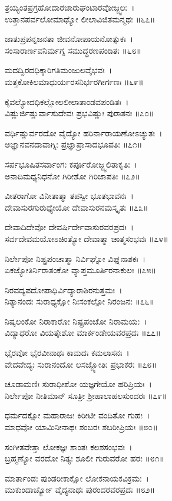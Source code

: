 	ತ್ರಯ್ಯಂತಪ್ರಗ್ರಹೋದಾರಚಾರುಘಂಟಾರವೋಜ್ಜ್ವಲಃ~।\\
	ಉತ್ತಾನಪರ್ವಲೋಮಾಢ್ಯೋ ಲೀಲಾವಿಜಿತಮನ್ಮಥಃ ॥೬೭॥

ಜಾತುಪ್ರಪನ್ನಜನತಾ ಜೀವನೋಪಾಯನೋತ್ಸುಕಃ~।\\
ಸಂಸಾರಾರ್ಣವನಿರ್ಮಗ್ನ ಸಮುದ್ಧರಣಪಂಡಿತಃ ॥೬೮॥

	ಮದದ್ವಿರದಧಿಕ್ಕಾರಿಗತಿಮಂಜುಲವೈಭವಃ~।\\
	ಮತ್ತಕೋಕಿಲಮಾಧುರ್ಯರಸನಿರ್ಭರಗೀರ್ಗಣಃ ॥೬೯॥

ಕೈವಲ್ಯೋದಧಿಕಲ್ಲೋಲಲೀಲಾತಾಂಡವಪಂಡಿತಃ~।\\
ವಿಷ್ಣುರ್ಜಿಷ್ಣುರ್ವಾಸುದೇವಃ ಪ್ರಭವಿಷ್ಣುಃ ಪುರಾತನಃ ॥೭೦॥

	ವರ್ಧಿಷ್ಣುರ್ವರದೋ ವೈದ್ಯೋ ಹರಿರ್ನಾರಾಯಣೋಽಚ್ಯುತಃ~।\\
	ಅಜ್ಞಾನವನದಾವಾಗ್ನಿಃ ಪ್ರಜ್ಞಾಪ್ರಾಸಾದಭೂಪತಿಃ ॥೭೧॥

ಸರ್ಪಭೂಷಿತಸರ್ವಾಂಗಃ ಕರ್ಪೂರೋಜ್ಜ್ವಲಿತಾಕೃತಿಃ~।\\
ಅನಾದಿಮಧ್ಯನಿಧನೋ ಗಿರೀಶೋ ಗಿರಿಜಾಪತಿಃ ॥೭೨॥

	ವೀತರಾಗೋ ವಿನೀತಾತ್ಮಾ ತಪಸ್ವೀ ಭೂತಭಾವನಃ~।\\
	ದೇವಾಸುರಗುರುಧ್ಯೇಯೋ ದೇವಾಸುರನಮಸ್ಕೃತಃ ॥೭೩॥

ದೇವಾದಿದೇವೋ ದೇವರ್ಷಿರ್ದೇವಾಸುರವರಪ್ರದಃ~।\\
ಸರ್ವದೇವಮಯೋಽಚಿಂತ್ಯೋ ದೇವಾತ್ಮಾ ಚಾತ್ಮಸಂಭವಃ ॥೭೪॥

	ನಿರ್ಲೇಪೋ ನಿಷ್ಪ್ರಪಂಚಾತ್ಮಾ ನಿರ್ವಿಘ್ನೋ ವಿಘ್ನನಾಶಕಃ~।\\
	ಏಕಜ್ಯೋತಿರ್ನಿರಾತಂಕೋ ವ್ಯಾಪ್ತಮೂರ್ತಿರನಾಕುಲಃ ॥೭೫॥

ನಿರವದ್ಯಪದೋಪಾಧಿರ್ವಿದ್ಯಾರಾಶಿರನುತ್ತಮಃ~।\\
ನಿತ್ಯಾನಂದಃ ಸುರಾಧ್ಯಕ್ಷೋ ನಿಃಸಂಕಲ್ಪೋ ನಿರಂಜನಃ ॥೭೬॥

	ನಿಷ್ಕಲಂಕೋ ನಿರಾಕಾರೋ ನಿಷ್ಪ್ರಪಂಚೋ ನಿರಾಮಯಃ~।\\
	ವಿದ್ಯಾಧರೋ ವಿಯತ್ಕೇಶೋ ಮಾರ್ಕಂಡೇಯವರಪ್ರದಃ ॥೭೭॥

ಭೈರವೋ ಭೈರವೀನಾಥಃ ಕಾಮದಃ ಕಮಲಾಸನಃ~।\\
ವೇದವೇದ್ಯಃ ಸುರಾನಂದೋ ಲಸಜ್ಜ್ಯೋತಿಃ ಪ್ರಭಾಕರಃ ॥೭೮॥

	ಚೂಡಾಮಣಿಃ ಸುರಾಧೀಶೋ ಯಜ್ಞಗೇಯೋ ಹರಿಪ್ರಿಯಃ~।\\
	ನಿರ್ಲೇಪೋ ನೀತಿಮಾನ್ ಸೂತ್ರೀ ಶ್ರೀಹಾಲಾಹಲಸುಂದರಃ ॥೭೯॥

ಧರ್ಮದಕ್ಷೋ ಮಹಾರಾಜಃ ಕಿರೀಟೀ ವಂದಿತೋ ಗುಹಃ~।\\
ಮಾಧವೋ ಯಾಮಿನೀನಾಥಃ ಶಂಬರಃ ಶಬರೀಪ್ರಿಯಃ ॥೮೦॥

	ಸಂಗೀತವೇತ್ತಾ ಲೋಕಜ್ಞಃ ಶಾಂತಃ ಕಲಶಸಂಭವಃ~।\\
	ಬ್ರಹ್ಮಣ್ಯೋ ವರದೋ ನಿತ್ಯಃ ಶೂಲೀ ಗುರುವರೋ ಹರಃ ॥೮೧॥

ಮಾರ್ತಾಂಡಃ ಪುಂಡರೀಕಾಕ್ಷೋ ಲೋಕನಾಯಕವಿಕ್ರಮಃ~।\\
ಮುಕುಂದಾರ್ಚ್ಯೋ ವೈದ್ಯನಾಥಃ ಪುರಂದರವರಪ್ರದಃ ॥೮೨॥

